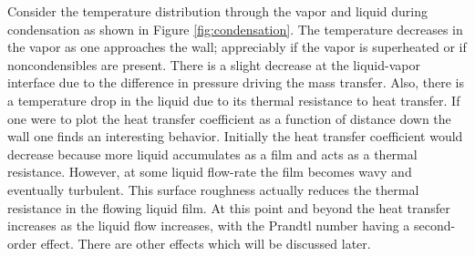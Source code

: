 Consider the temperature distribution through the vapor and liquid during condensation as shown in Figure \ref{fig:condensation}.
The temperature decreases in the vapor as one approaches the wall; appreciably if the vapor is superheated or if noncondensibles are present.
There is a slight decrease at the liquid-vapor interface due to the difference in pressure driving the mass transfer.
Also, there is a temperature drop in the liquid due to its thermal resistance to heat transfer.
If one were to plot the heat transfer coefficient as a function of distance down the wall one finds an interesting behavior.
Initially the heat transfer coefficient would decrease because more liquid accumulates as a film and acts as a thermal resistance.
However, at some liquid flow-rate the film becomes wavy and eventually turbulent.
This surface roughness actually reduces the thermal resistance in the flowing liquid film.
At this point and beyond the heat transfer increases as the liquid flow increases, with the Prandtl number having a second-order effect.
There are other effects which will be discussed later.